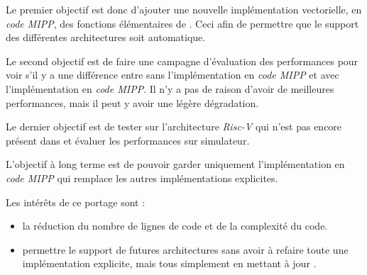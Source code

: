 Le premier objectif est donc d'ajouter une nouvelle implémentation vectorielle, en
\emph{code MIPP}, des fonctions élémentaires de \Eigen. Ceci afin de permettre que le
support des différentes architectures soit automatique.

Le second objectif est de faire une campagne d'évaluation des performances pour voir
s'il y a une différence entre \Eigen sans l'implémentation en \emph{code MIPP} et
\Eigen avec l'implémentation en \emph{code MIPP}. Il n'y a pas de raison d'avoir
de meilleures performances, mais il peut y avoir une légère dégradation.

Le dernier objectif est de tester \Eigen sur l'architecture \emph{Risc-V} qui n'est
pas encore présent dans \Eigen et évaluer les performances sur simulateur.

L'objectif à long terme est de pouvoir garder uniquement l'implémentation en
\emph{code MIPP} qui remplace les autres implémentations explicites.

Les intérêts de ce portage sont :
\begin{itemize}
  \item la réduction du nombre de lignes de code et de la complexité du code.
  \item permettre le support de futures architectures sans avoir à refaire toute une
  implémentation explicite, mais tous simplement en mettant à jour \MIPP.
\end{itemize}
